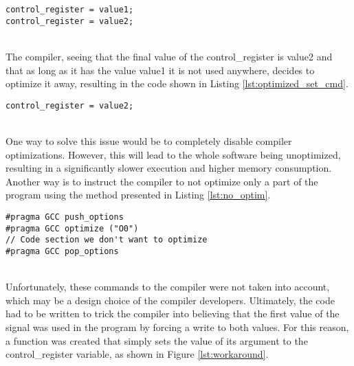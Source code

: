 \noindent
\begin{minipage}{\linewidth}
\begin{lstlisting}[style=mycodestyle, label={lst:set_cmd}, caption={Example of setting peripheral control signals}]
control_register = value1;
control_register = value2;
\end{lstlisting}
\end{minipage}\\

The compiler, seeing that the final value of the control\_register is value2 and that as long as it has the value value1 it is not used anywhere, decides to optimize it away, resulting in the code shown in Listing \ref{lst:optimized_set_cmd}. \\

\noindent
\begin{minipage}{\linewidth}
\begin{lstlisting}[style=mycodestyle, label={lst:optimized_set_cmd}, caption={Setting peripheral control signals after compiler optimization}]
control_register = value2;
\end{lstlisting}
\end{minipage}\\

One way to solve this issue would be to completely disable compiler optimizations. However, this will lead to the whole software being unoptimized, resulting in a significantly slower execution and higher memory consumption. Another way is to instruct the compiler to not optimize only a part of the program using the method presented in Listing \ref{lst:no_optim}.\\

\noindent
\begin{minipage}{\linewidth}
\begin{lstlisting}[style=mycodestyle, label={lst:no_optim}, caption={Instructing the compiler to not optimize a code segment}]
#pragma GCC push_options
#pragma GCC optimize ("O0")
// Code section we don't want to optimize
#pragma GCC pop_options
\end{lstlisting}
\end{minipage}\\


Unfortunately, these commands to the compiler were not taken into account, which may be a design choice of the compiler developers. Ultimately, the code had to be written to trick the compiler into believing that the first value of the signal was used in the program by forcing a write to both values. For this reason, a function was created that simply sets the value of its argument to the control\_register variable, as shown in Figure \ref{lst:workaround}.\\

